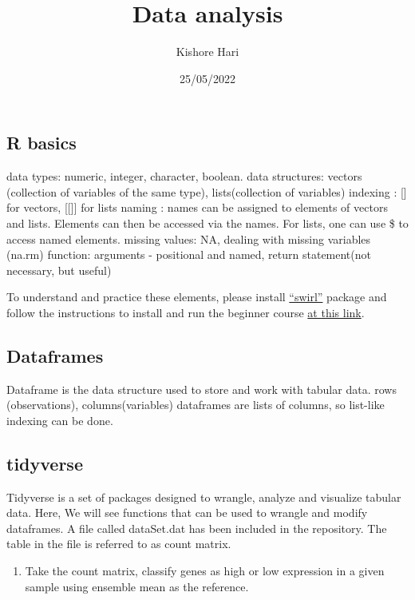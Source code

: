 \documentclass[
]{article}
\title{Data analysis}
\author{Kishore Hari}
\date{25/05/2022}
\providecommand{\tightlist}{%
  \setlength{\itemsep}{0pt}\setlength{\parskip}{0pt}}
\begin{document}
\maketitle

\hypertarget{r-basics}{%
\subsection{R basics}\label{r-basics}}

data types: numeric, integer, character, boolean. data structures:
vectors (collection of variables of the same type), lists(collection of
variables) indexing : {[}{]} for vectors, {[}{[}{]}{]} for lists naming
: names can be assigned to elements of vectors and lists. Elements can
then be accessed via the names. For lists, one can use \$ to access
named elements. missing values: NA, dealing with missing variables
(na.rm) function: arguments - positional and named, return statement(not
necessary, but useful)

To understand and practice these elements, please install
\href{https://swirlstats.com/students.html}{``swirl''} package and
follow the instructions to install and run the beginner course
\href{https://github.com/swirldev/swirl_courses/blob/master/README.md}{at
this link}.

\hypertarget{dataframes}{%
\subsection{Dataframes}\label{dataframes}}

Dataframe is the data structure used to store and work with tabular
data. rows (observations), columns(variables) dataframes are lists of
columns, so list-like indexing can be done.

\hypertarget{tidyverse}{%
\subsection{tidyverse}\label{tidyverse}}

Tidyverse is a set of packages designed to wrangle, analyze and
visualize tabular data. Here, We will see functions that can be used to
wrangle and modify dataframes. A file called dataSet.dat has been
included in the repository. The table in the file is referred to as
count matrix.

\begin{enumerate}
\def\labelenumi{\arabic{enumi}.}
\tightlist
\item
  Take the count matrix, classify genes as high or low expression in a
  given sample using ensemble mean as the reference.
\end{enumerate}
\end{document}
